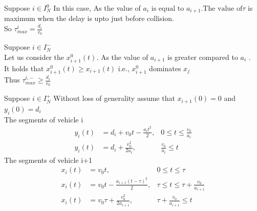 \documentclass{beamer}
\begin{document}
\begin{frame}
   \begin{block}{Suppose $i \in I_{N}^{0}$}
    In this case, As the value of $a_{i} \text{ is equal to } a_{i+1}.\text{The value of}\tau$ is maximum when the delay is upto just before collision.\\ So $\tau_{max}^{i} = \frac{d_{i}}{v_{0}}$
    \end{block}
\begin{block}{ Suppose $i \in I_{N}^{-}$\\}
     Let us consider the $x_{i+1}^{0} (t)$. As the value of $a_{i+1}$ is greater compared to $a_{i}$ .\\It holds that $x_{i+1}^{0} (t) \geq x_{i+1} (t)$ i.e., $x_{i+1}^{0}$ dominates $x_{j}$\\
     Thus $\tau_{max} ^{i,-} \geq \frac{d_{i}}{v_{0}}$
    \end{block}
\end{frame}
\begin{frame}
    \begin{block}{Suppose $i \in I_{N}^{+}$}
      Without loss of generality assume that $x_{i+1}(0)=0$ and $y_{i}(0)=d_{i}$\\
    The segments of vehicle i
    \begin{align}
         y_{i}(t) &= d_{i} + v_{0} t - \frac{a_{i} t^2}{2} ,  &0\leq t\leq \frac{v_{0}}{a_{i}}\\
         y_{i}(t) &= d_{i} + \frac{v_{0}^2}{2 a_{i}} , &\frac{v_{0}}{a_{i}}\leq t
    \end{align}
    The segments of vehicle i+1
    \begin{align}
        x_{i}(t) &= v_{0} t, &0\leq t\leq \tau \\
         x_{i}(t) &= v_{0} t - \frac{a_{i+1} (t-\tau)^2}{2}, &\tau \leq t\leq \tau + \frac{v_{0}}{a_{i+1}}\\
        x_{i}(t) &= v_{0} \tau + \frac{v_{0}^2}{2 a_{i+1}}, &\tau + \frac{v_{0}}{a_{i+1}}\leq t 
    \end{align}
    \end{block}
\end{frame}
\end{document}
